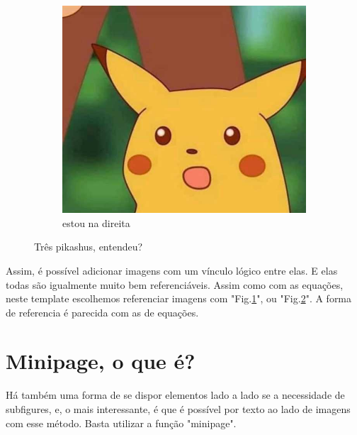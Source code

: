 \begin{figure}[h!]
\begin{subfigure}[b]{0.3\textwidth}
	\end{subfigure}
	\hfill
	\begin{subfigure}[b]{0.3\textwidth}
		\centering
		\includegraphics[width=\textwidth]{midia/exemplo}
		\caption{estou na direita}
		\label{pika4}
	\end{subfigure}
	\caption{Três pikashus, entendeu?}
	\label{pika5}
\end{figure}

Assim, é possível adicionar imagens com um vínculo lógico entre elas. E elas todas são igualmente muito bem referenciáveis. Assim como com as equações, neste template escolhemos referenciar imagens com "Fig.\ref{pika4}", ou "Fig.\ref{pika5}". A forma de referencia é parecida com as de equações.

\section{Minipage, o que é?}

Há também uma forma de se dispor elementos lado a lado se a necessidade de subfigures, e, o mais interessante, é que é possível por texto ao lado de imagens com esse método. Basta utilizar a função "minipage". 	

